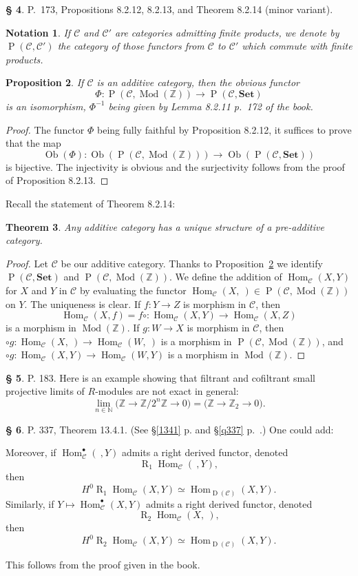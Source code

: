 \documentclass[12pt]{article}
\newtheorem{thm}{Theorem}
\newtheorem{prop}[thm]{Proposition}
\newtheorem{nota}[thm]{Notation}
\theoremstyle{remark}
\theoremstyle{definition}
\newtheorem{s}[thm]{\S}
\newcommand{\bu}{\bullet}
\newcommand{\bb}{\mathbb}
\newcommand{\C}{\mathcal C}
\newcommand{\oo}{\operatorname}
\newcommand{\Set}{\mathbf{Set}}
\newcommand{\mv}{ (minor variant)}
\DeclareMathOperator{\Hom}{Hom}%
\DeclareMathOperator{\Mod}{Mod}
\begin{document}
\begin{s}\label{8212}
P.~173, Propositions 8.2.12, 8.2.13, and Theorem 8.2.14 \mv. 
\begin{nota}
If $\C$ and $\C'$ are categories admitting finite products, we denote by $\oo P(\C,\C')$ the category of those functors from $\C$ to $\C'$ which commute with finite products.
\end{nota}
%
\begin{prop}\label{8.2.12}
If $\C$ is an additive category, then the obvious functor 
$$
\Phi:\oo P(\C,\Mod(\mathbb Z))\to\oo P(\C,\Set)
$$ 
is an isomorphism, $\Phi^{-1}$ being given by Lemma 8.2.11 p.~172 of the book.
\end{prop}
%
\begin{proof}
The functor $\Phi$ being fully faithful by Proposition 8.2.12, it suffices to prove that the map 
$$
\oo{Ob}(\Phi):\oo{Ob}(\oo P(\C,\Mod(\mathbb Z)))\to\oo{Ob}(\oo P(\C,\Set))
$$ 
is bijective. The injectivity is obvious and the surjectivity follows from the proof of Proposition 8.2.13.
\end{proof}

Recall the statement of Theorem 8.2.14:
%
\begin{thm}
Any additive category has a unique structure of a pre-additive category.
\end{thm}
%
\begin{proof}
Let $\C$ be our additive category. Thanks to Proposition~\ref{8.2.12} we identify $\oo P(\C,\Set)$ and $\oo P(\C,\Mod(\mathbb Z))$. We define the addition of $\Hom_\C(X,Y)$ for $X$ and $Y$ in $\C$ by evaluating the functor $\Hom_\C(X,\ )\in\oo P(\C,\Mod(\mathbb Z))$ on $Y$. The uniqueness is clear. If $f:Y\to Z$ is morphism in $\C$, then 
$$
\Hom_\C(X,f)=f\circ:\Hom_\C(X,Y)\to\Hom_\C(X,Z)
$$ 
is a morphism in $\Mod(\mathbb Z)$. If $g:W\to X$ is morphism in $\C$, then $\circ g:\Hom_\C(X,\ )\to\Hom_\C(W,\ )$ is a morphism in $\oo P(\C,\Mod(\mathbb Z))$, and $\circ g:\Hom_\C(X,Y)\to\Hom_\C(W,Y)$ is a morphism in $\Mod(\mathbb Z)$.
\end{proof}
\end{s}
%
%
\begin{s}\label{adic}
P. 183. Here is an example showing that filtrant and cofiltrant small projective limits of $R$-modules are not exact in general: 
$$
\lim_{n\in\bb N}\big(\bb Z\to\bb Z/2^n\bb Z\to0\big)=\big(\bb Z\to\bb Z_2\to0\big).
$$
\end{s}
%
%
\begin{s}\label{1341b}
P. 337, Theorem 13.4.1. (See \S\ref{1341} p. \pageref{1341} and \S\ref{q337} p.~\pageref{q337}.) One could add:

Moreover, if $\Hom_\C^\bu(\ ,Y)$ admits a right derived functor, denoted 
$$
\oo R_1\!\Hom_\C(\ ,Y),
$$ 
then 
$$
H^0\oo R_1\!\Hom_\C(X,Y)\simeq\Hom_{\oo D(\C)}(X,Y).
$$ 
Similarly, if $Y\mapsto\Hom_\C^\bu(X,Y)$ admits a right derived functor, denoted 
$$
\oo R_2\!\Hom_\C(X,\ ),
$$ 
then 
$$
H^0\oo R_2\!\Hom_\C(X,Y)\simeq\Hom_{\oo D(\C)}(X,Y).
$$

This follows from the proof given in the book. 
\end{s}
\end{document}
